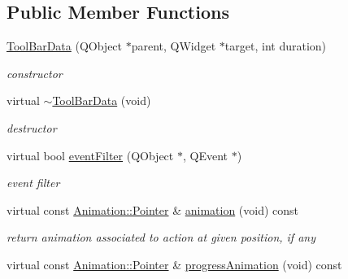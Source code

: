 \subsection*{Public Member Functions}
\begin{DoxyCompactItemize}
\item 
\mbox{\label{class_tool_bar_data_a3edb43f76a04b44698e13e6a43303d6c}} 
\hyperlink{class_tool_bar_data_a3edb43f76a04b44698e13e6a43303d6c}{Tool\+Bar\+Data} (Q\+Object $\ast$parent, Q\+Widget $\ast$target, int duration)
\begin{DoxyCompactList}\small\item\em constructor \end{DoxyCompactList}\item 
\mbox{\label{class_tool_bar_data_a685fb19a3dd17c19ecd40d10a3e73dfb}} 
virtual \hyperlink{class_tool_bar_data_a685fb19a3dd17c19ecd40d10a3e73dfb}{$\sim$\+Tool\+Bar\+Data} (void)
\begin{DoxyCompactList}\small\item\em destructor \end{DoxyCompactList}\item 
\mbox{\label{class_tool_bar_data_a760b73017537688845e5a3b47adaf7b2}} 
virtual bool \hyperlink{class_tool_bar_data_a760b73017537688845e5a3b47adaf7b2}{event\+Filter} (Q\+Object $\ast$, Q\+Event $\ast$)
\begin{DoxyCompactList}\small\item\em event filter \end{DoxyCompactList}\item 
\mbox{\label{class_tool_bar_data_a107a036f75154ca155f5511f0987a078}} 
virtual const \hyperlink{class_animation_ac48a8d074abd43dc3f6485353ba24e30}{Animation\+::\+Pointer} \& \hyperlink{class_tool_bar_data_a107a036f75154ca155f5511f0987a078}{animation} (void) const
\begin{DoxyCompactList}\small\item\em return animation associated to action at given position, if any \end{DoxyCompactList}\item 
\mbox{\label{class_tool_bar_data_af6f21632fd78fc7fed6a506d3c3c0857}} 
virtual const \hyperlink{class_animation_ac48a8d074abd43dc3f6485353ba24e30}{Animation\+::\+Pointer} \& \hyperlink{class_tool_bar_data_af6f21632fd78fc7fed6a506d3c3c0857}{progress\+Animation} (void) const

\end{DoxyCompactItemize}
